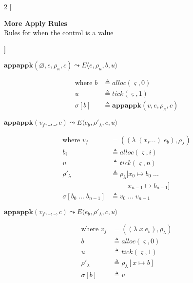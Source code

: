 \documentclass[12pt,draft]{article}
\newcommand{\lamsyn}[2]{(\lambda\;(#1 ...)\;#2)}
\newcommand{\vararglamsyn}[2]{(\lambda\;#1\;#2)}
\begin{document}
\begin{multicols*}{2}
[
\begin{center}
\textbf{More Apply Rules} \\
Rules for when the control is a value
\end{center}
]
\begin{center}
  $\textbf{appappk}(\varnothing, e, \rho_\kappa, c)
  \leadsto E\langle e , \rho_\kappa , b , u \rangle$
\end{center}
\vspace{-7mm}
\begin{align*}
\text{where } b &\triangleq alloc(\varsigma, 0) \\
u &\triangleq tick(\varsigma, 1) \\
\sigma[b] &\triangleq \textbf{appappk}(v, e, \rho_{\kappa}, c)
\end{align*}
\begin{center}
  $\textbf{appappk}(v_f, \_, \_, c)
  \leadsto E\langle e_b , \rho'_\lambda , c , u \rangle$
\end{center}
\vspace{-7mm}
\begin{align*}
\text{where } v_f &= (\lamsyn{x_s}{e_b}, \rho_{\lambda}) \\
b_i &\triangleq alloc(\varsigma, i) \\
u &\triangleq tick(\varsigma, n) \\
\rho'_{\lambda} &\triangleq \rho_{\lambda}[x_0 \mapsto b_0\; ... \\
&\;\;\;\;\;\;\;\;\;x_{n-1} \mapsto b_{n-1}] \\
\sigma[b_0\;...\; b_{n-1}] &\triangleq v_0\;...\;v_{n-1}
\end{align*}
\begin{center}
  $\textbf{appappk}(v_f, \_, \_, c)
  \leadsto E\langle e_b , \rho'_\lambda , c , u \rangle$
\end{center}
\vspace{-7mm}
\begin{align*}
\text{where } v_f &= (\vararglamsyn{x}{e_b}, \rho_{\lambda}) \\
b &\triangleq alloc(\varsigma, 0) \\
u &\triangleq tick(\varsigma, 1) \\
\rho'_{\lambda} &\triangleq \rho_{\lambda}[x \mapsto b] \\
\sigma[b] &\triangleq v
\end{align*}


\end{multicols*}
\end{document}
